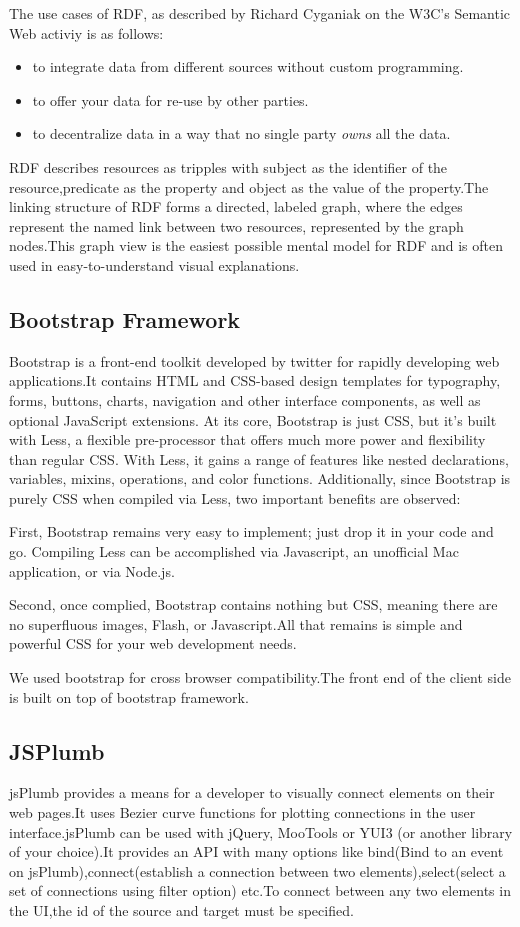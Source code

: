 \begin{spacing}{1.5}
The use cases of RDF, as described by Richard Cyganiak on the W3C's Semantic Web activiy is as follows:
\begin{itemize}
\item{to integrate data from different sources without custom programming.}
\item{to offer your data for re-use by other parties.}
\item{to decentralize data in a way that no single party {\it owns} all the data.}
\end{itemize}


RDF describes resources as tripples with subject as the identifier of the resource,predicate as the property and object as the value of the property.The linking structure of RDF forms a directed, labeled graph, where the edges  represent the named link between two resources, represented by the graph nodes.This graph view is the easiest possible mental model for RDF and is often used in easy-to-understand visual explanations.


\subsection{Bootstrap Framework}
Bootstrap is a front-end toolkit developed by twitter for rapidly developing web applications\cite{bootstrap}.It contains HTML and CSS-based design templates
for typography, forms, buttons, charts, navigation and other interface components, as well as optional JavaScript extensions. At its core, Bootstrap is just CSS, but it's built with Less, a flexible pre-processor that offers much more power and flexibility than regular CSS. With Less, it gains a range of features like nested declarations, variables, mixins, operations, and color functions. Additionally, since Bootstrap is purely CSS when compiled via Less, two important benefits are observed:

First, Bootstrap remains very easy to implement; just drop it in your code and go. Compiling Less can be accomplished via Javascript, an unofficial Mac application, or via Node.js.

Second, once complied, Bootstrap contains nothing but CSS, meaning there are no superfluous images, Flash, or Javascript.All that remains is simple and powerful CSS for your web development needs.

We used bootstrap for cross browser compatibility.The front end of the client side is built on top of bootstrap framework.

\subsection{JSPlumb}
jsPlumb provides a means for a developer to visually connect elements on their web pages.It uses Bezier curve functions for plotting connections in the user interface.jsPlumb can be used with jQuery, MooTools or YUI3 (or another library of your choice).It provides an API with many options like bind(Bind to an event on jsPlumb),connect(establish a connection between two elements),select(select a set of connections using filter option) etc.To connect between any two elements in the UI,the id of the source and target must be specified.


\end{spacing}
